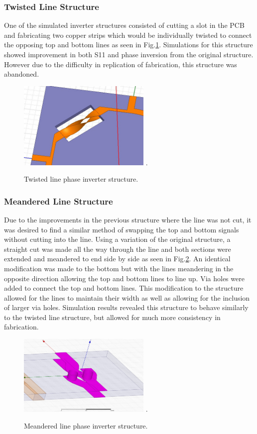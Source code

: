 \subsubsection{Twisted Line Structure}
One of the simulated inverter structures consisted of cutting a slot in the PCB and fabricating two copper strips which would be individually twisted to connect the opposing top and bottom lines as seen in Fig.\ref{fig_linetwist}. Simulations for this structure showed improvement in both S11 and phase inversion from the original structure. However due to the difficulty in replication of fabrication, this structure was abandoned.

 \begin{figure}[!t]
\centering
\includegraphics[width=2.5in]{linetwist.jpg}
\DeclareGraphicsExtensions.
\caption{Twisted line phase inverter structure.}
\label{fig_linetwist}
\end{figure} 

\subsubsection{Meandered Line Structure}
Due to the improvements in the previous structure where the line was not cut, it was desired to find a similar method of swapping the top and bottom signals without cutting into the line. Using a variation of the original structure, a straight cut was made all the way through the line and both sections were extended and meandered to end side by side as seen in  Fig.\ref{fig_swerve}. An identical modification was made to the bottom but with the lines meandering in the opposite direction allowing the top and bottom lines to line up. Via holes were added to connect the top and bottom lines. This modification to the structure allowed for the lines to maintain their width as well as allowing for the inclusion of larger via holes. Simulation results revealed this structure to behave similarly to the twisted line structure, but allowed for much more consistency in fabrication.

 \begin{figure}[!t]
\centering
\includegraphics[width=2.5in]{swerve.jpg}
\DeclareGraphicsExtensions.
\caption{Meandered line phase inverter structure.}
\label{fig_swerve}
\end{figure} 

